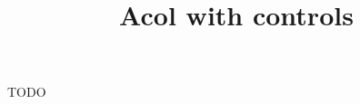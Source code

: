\documentclass[12pt, a4paper]{article}
\title{Acol with controls}
\author{}
\begin{document}
\maketitle


TODO



\end{document}
